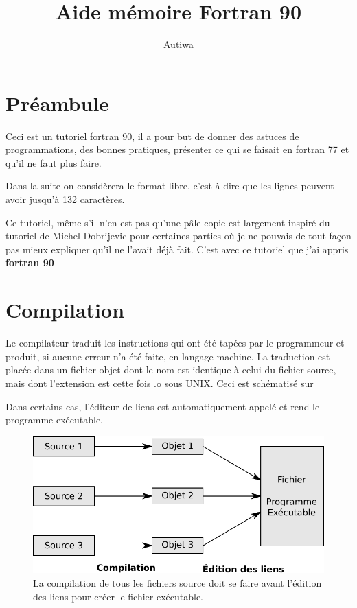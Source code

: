 \documentclass[a4paper,twoside]{article}
\title{Aide mémoire Fortran 90}
\author{Autiwa}
\begin{document}
\tableofcontents

\clearpage

\section{Préambule}
Ceci est un tutoriel fortran 90, il a pour but de donner des astuces de programmations, des bonnes pratiques, présenter ce qui se faisait en fortran 77 et qu'il ne faut plus faire. 

Dans la suite on considèrera le format libre, c'est à dire que les lignes peuvent avoir jusqu'à 132 caractères.

\begin{important}
Ce tutoriel, même s'il n'en est pas qu'une pâle copie est largement inspiré du tutoriel de Michel Dobrijevic pour certaines parties où je ne pouvais de tout façon pas mieux expliquer qu'il ne l'avait déjà fait. C'est avec ce tutoriel que j'ai appris \textbf{fortran 90}
\end{important}


\section{Compilation}
Le compilateur traduit les instructions qui ont été tapées par le programmeur et produit, si aucune erreur n'a été faite, en langage machine. La traduction est placée dans un fichier objet dont le nom est identique à celui du fichier source, mais dont l'extension est cette fois .o sous UNIX. Ceci est schématisé sur 

\begin{attention}
Dans certains cas, l'éditeur de liens est automatiquement appelé et rend le programme exécutable.
\end{attention}

\begin{figure}[htb]
\centering
\includegraphics[width=0.65\linewidth]{figure/compilation.pdf}
\caption{La compilation de tous les fichiers source doit se faire avant l'édition des liens pour créer le fichier exécutable.}\label{fig:compilation}
\end{figure}
\end{document}
